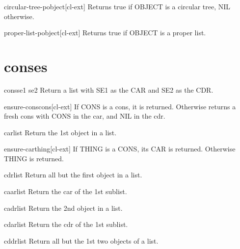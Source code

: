 \documentclass[10pt,english]{book}
\begin{document}
\begin{function}{circular-tree-p}{object}[cl-ext]
  Returns true if OBJECT is a circular tree, NIL otherwise.
\end{function}

\begin{function}{proper-list-p}{object}[cl-ext]
  Returns true if OBJECT is a proper list.
\end{function}

\section{conses}
\label{sec:conses}

\begin{function}{cons}{se1 se2}
  Return a list with SE1 as the CAR and SE2 as the CDR.
\end{function}

\begin{function}{ensure-cons}{cons}[cl-ext]
  If CONS is a cons, it is returned. Otherwise returns a fresh cons with CONS
  in the car, and NIL in the cdr.
\end{function}

\begin{accessor}{car}{list}
  Return the 1st object in a list.
\end{accessor}

\begin{function}{ensure-car}{thing}[cl-ext]
  If THING is a CONS, its CAR is returned. Otherwise THING is returned.
\end{function}

\begin{accessor}{cdr}{list}
  Return all but the first object in a list.
\end{accessor}

\begin{accessor}{caar}{list}
  Return the car of the 1st sublist.
\end{accessor}

\begin{accessor}{cadr}{list}
  Return the 2nd object in a list.
\end{accessor}

\begin{accessor}{cdar}{list}
  Return the cdr of the 1st sublist.
\end{accessor}

\begin{accessor}{cddr}{list}
  Return all but the 1st two objects of a list.
\end{accessor}
\end{document}
